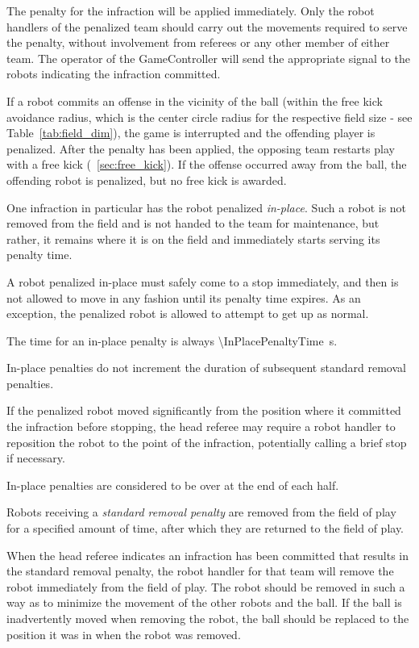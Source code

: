 The penalty for the infraction will be applied immediately. Only the robot handlers of the penalized team should carry out the movements required to serve the penalty, without involvement from referees or any other member of either team. The operator of the GameController will send the appropriate signal to the robots indicating the infraction committed.

If a robot commits an offense in the vicinity of the ball (within the free kick avoidance radius, which is the center circle radius for the respective field size - see Table~\ref{tab:field_dim}), the game is interrupted and the offending player is penalized. After the penalty has been applied, the opposing team restarts play with a free kick (\cf~\cref{sec:free_kick}). If the offense occurred away from the ball, the offending robot is penalized, but no free kick is awarded.



One infraction in particular has the robot penalized \textit{in-place}. Such a robot is not removed from the field and is not handed to the team for maintenance, but rather, it remains where it is on the field and immediately starts serving its penalty time.

A robot penalized in-place must safely come to a stop immediately, and then is not allowed to move in any fashion until its penalty time expires. As an exception, the penalized robot is allowed to attempt to get up as normal.

The time for an in-place penalty is always \qty{\InPlacePenaltyTime}{\second}.

In-place penalties do not increment the duration of subsequent standard removal penalties.

If the penalized robot moved significantly from the position where it committed the infraction before stopping, the head referee may require a robot handler to reposition the robot to the point of the infraction, potentially calling a brief stop if necessary.

In-place penalties are considered to be over at the end of each half.

\label{sec:removal_penalty}

Robots receiving a \textit{standard removal penalty} are removed from the field of play for a specified amount of time, after which they are returned to the field of play.

When the head referee indicates an infraction has been committed that results in the standard removal penalty, the robot handler for that team will remove the robot immediately from the field of play. The robot should be removed in such a way as to minimize the movement of the other robots and the ball. If the ball is inadvertently moved when removing the robot, the ball should be replaced to the position it was in when the robot was removed. 

